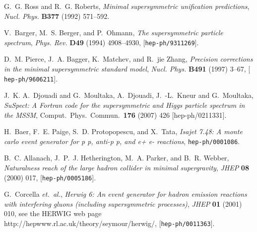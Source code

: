 \documentclass{article}
\begin{document}
\providecommand{\href}[2]{#2}\begingroup\raggedright\begin{thebibliography}{10}

G.~G. Ross and R.~G. Roberts, {\it Minimal supersymmetric unification
  predictions},  {\em Nucl. Phys.} {\bf B377} (1992) 571--592.

V.~Barger, M.~S. Berger, and P.~Ohmann, {\it The supersymmetric particle
  spectrum},  {\em Phys. Rev.} {\bf D49} (1994) 4908--4930,
  [\href{http://xxx.lanl.gov/abs/hep-ph/9311269}{{\tt hep-ph/9311269}}].

D.~M. Pierce, J.~A. Bagger, K.~Matchev, and R.~jie Zhang, {\it Precision
  corrections in the minimal supersymmetric standard model},  {\em Nucl. Phys.}
  {\bf B491} (1997) 3--67, [\href{http://xxx.lanl.gov/abs/hep-ph/9606211}{{\tt
  hep-ph/9606211}}].

J.~K. A.~Djouadi and G.~Moultaka, A.~Djouadi, J.~-L.~Kneur and G.~Moultaka,
  {\em SuSpect: A Fortran code for the supersymmetric and Higgs particle spectrum in the MSSM},
  Comput.\ Phys.\ Commun.\  {\bf 176} (2007) 426
  [hep-ph/0211331].

H.~Baer, F.~E. Paige, S.~D. Protopopescu, and X.~Tata, {\it Isajet 7.48: A
  monte carlo event generator for p p, anti-p p, and e+ e- reactions},
  \href{http://xxx.lanl.gov/abs/hep-ph/0001086}{{\tt hep-ph/0001086}}.

B.~C. Allanach, J.~P.~J. Hetherington, M.~A. Parker, and B.~R. Webber, {\it
  Naturalness reach of the large hadron collider in minimal supergravity},
  {\em JHEP} {\bf 08} (2000) 017,
  [\href{http://xxx.lanl.gov/abs/hep-ph/0005186}{{\tt hep-ph/0005186}}].

G.~Corcella {\em et.~al.}, {\it Herwig 6: An event generator for hadron
  emission reactions with interfering gluons (including supersymmetric
  processes)},  {\em JHEP} {\bf 01} (2001) 010,
  see the \href{http://hepwww.rl.ac.uk/theory/seymour/herwig/}{HERWIG web
page http://hepwww.rl.ac.uk/theory/seymour/herwig/}, 
  [\href{http://xxx.lanl.gov/abs/hep-ph/0011363}{{\tt hep-ph/0011363}}].



\end{thebibliography}
\end{document}
